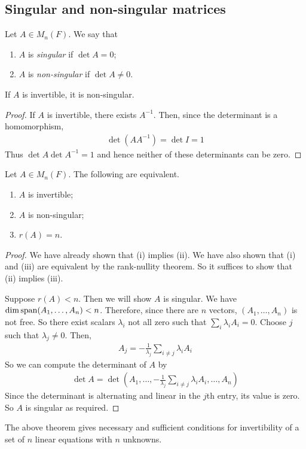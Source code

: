 \subsection{Singular and non-singular matrices}
\begin{definition}
	Let $A \in M_n(F)$.
	We say that
	\begin{enumerate}
		\item $A$ is \textit{singular} if $\det A = 0$;
		\item $A$ is \textit{non-singular} if $\det A \neq 0$.
	\end{enumerate}
\end{definition}
\begin{lemma}
	If $A$ is invertible, it is non-singular.
\end{lemma}
\begin{proof}
	If $A$ is invertible, there exists $A^{-1}$.
	Then, since the determinant is a homomorphism,
	\begin{align*}
		\det(A A^{-1}) = \det I = 1
	\end{align*}
	Thus $\det A \det A^{-1} = 1$ and hence neither of these determinants can be zero.
\end{proof}
\begin{theorem}
	Let $A \in M_n(F)$.
	The following are equivalent.
	\begin{enumerate}
		\item $A$ is invertible;
		\item $A$ is non-singular;
		\item $r(A) = n$.
	\end{enumerate}
\end{theorem}
\begin{proof}
	We have already shown that (i) implies (ii).
	We have also shown that (i) and (iii) are equivalent by the rank-nullity theorem.
	So it suffices to show that (ii) implies (iii).

	Suppose $r(A) < n$.
	Then we will show $A$ is singular.
	We have $\dim \operatorname{span}(A_1, \dots, A_n) < n$.
	Therefore, since there are $n$ vectors, $(A_1, \dots, A_n)$ is not free.
	So there exist scalars $\lambda_i$ not all zero such that $\sum_i \lambda_i A_i = 0$.
	Choose $j$ such that $\lambda_j \neq 0$.
	Then,
	\begin{align*}
		A_j = -\frac{1}{\lambda_j} \sum_{i \neq j} \lambda_i A_i
	\end{align*}
	So we can compute the determinant of $A$ by
	\begin{align*}
		\det A = \det(A_1, \dots, -\frac{1}{\lambda_j} \sum_{i \neq j} \lambda_i A_i, \dots, A_n)
	\end{align*}
	Since the determinant is alternating and linear in the $j$th entry, its value is zero.
	So $A$ is singular as required.
\end{proof}
\begin{remark}
	The above theorem gives necessary and sufficient conditions for invertibility of a set of $n$ linear equations with $n$ unknowns.
\end{remark}

